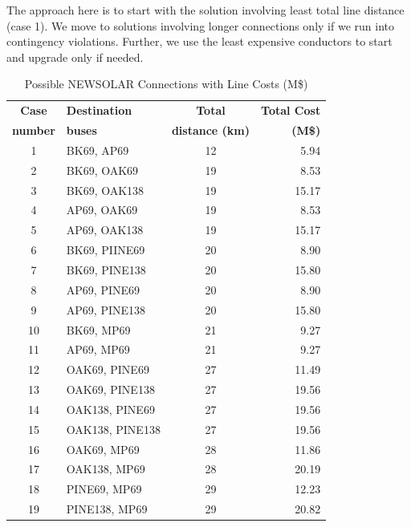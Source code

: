 \documentclass[conference]{IEEEtran}
\begin{document}
The approach here is to start with the solution involving least total line distance (case 1). We move to solutions involving longer connections only if we run into contingency violations. Further, we use the least expensive conductors to start and upgrade only if needed. 
\begin{table}[h]
	\centering
	\begin{tabular}{|c|l|c|r|}
		\hline
		\textbf{Case} & \textbf{Destination} & \textbf{Total} & \textbf{Total Cost} \\
		\textbf{number} & \textbf{buses} & \textbf{distance (km)} & \textbf{(M\$)} \\
		\hline
		1 & BK69, AP69 & 12 & 5.94 \\
		2 & BK69, OAK69 & 19 & 8.53 \\
		3 & BK69, OAK138 & 19 & 15.17 \\
		4 & AP69, OAK69 & 19 & 8.53 \\
		5 & AP69, OAK138 & 19 & 15.17 \\
		6 & BK69, PIINE69 & 20 & 8.90 \\
		7 & BK69, PINE138 & 20 & 15.80 \\
		8 & AP69, PINE69 & 20 & 8.90 \\
		9 & AP69, PINE138 & 20 & 15.80 \\
		10 & BK69, MP69 & 21 & 9.27 \\
		11 & AP69, MP69 & 21 & 9.27 \\
		12 & OAK69, PINE69 & 27 & 11.49 \\
		13 & OAK69, PINE138 & 27 & 19.56 \\
		14 & OAK138, PINE69 & 27 & 19.56 \\
		15 & OAK138, PINE138 & 27 & 19.56 \\
		16 & OAK69, MP69 & 28 & 11.86 \\
		17 & OAK138, MP69 & 28 & 20.19 \\
		18 & PINE69, MP69 & 29 & 12.23 \\
		19 & PINE138, MP69 & 29 & 20.82 \\
		\hline
	\end{tabular}
	\vspace{0.5em}
	\caption{Possible NEWSOLAR Connections with Line Costs (M\$)}
	\label{tab:all_conn}
\end{table}
\end{document}
